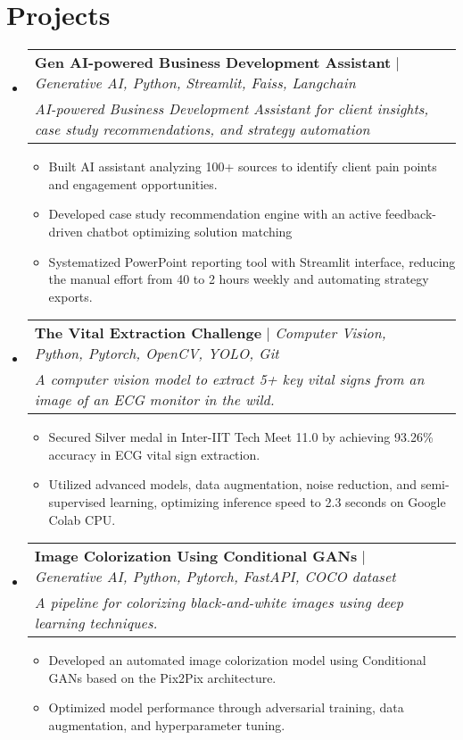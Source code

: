 \documentclass[letterpaper,11pt]{article}
\makeatletter
\newcommand{\resumeItem}[1]{
  \item\small{
    {#1 \vspace{-2pt}}
  }
}
\newcommand{\resumeProjectHeading}[3]{
    \item
    \begin{tabular*}{0.97\textwidth}{l@{\extracolsep{\fill}}r}
      \small#1 & #2 \\
    \textit{\footnotesize{#3}}
    \end{tabular*}\vspace{-7pt}
}
\newcommand{\resumeSubHeadingListStart}{\begin{itemize}[leftmargin=0.15in, label={}]}
\newcommand{\resumeSubHeadingListEnd}{\end{itemize}}
\newcommand{\resumeItemListStart}{\begin{itemize}}
\newcommand{\resumeItemListEnd}{\end{itemize}\vspace{-5pt}}
\makeatother
\begin{document}
\section{Projects}
    \resumeSubHeadingListStart
      \resumeProjectHeading
          {\textbf{Gen AI-powered Business Development Assistant} $|$  \emph{Generative AI, Python, Streamlit, Faiss, Langchain}}{}
          {AI-powered Business Development Assistant for client insights, case study recommendations, and strategy automation}
          \resumeItemListStart
            \resumeItem{Built AI assistant analyzing 100+ sources to identify client pain points and engagement opportunities.}
            \resumeItem{Developed case study recommendation engine with an active feedback-driven chatbot optimizing solution matching}
            \resumeItem{Systematized PowerPoint reporting tool with Streamlit interface, reducing the manual effort from 40 to 2 hours weekly and automating strategy exports.}
          \resumeItemListEnd
      \resumeProjectHeading
          {\textbf{The Vital Extraction Challenge} $|$ \emph{Computer Vision, Python, Pytorch, OpenCV, YOLO, Git}}{}
          {A computer vision model to extract 5+ key vital signs from an image of an ECG monitor in the wild.}
          \resumeItemListStart
            \resumeItem{Secured Silver medal in Inter-IIT Tech Meet 11.0 by achieving 93.26\% accuracy in ECG vital sign extraction.}
            \resumeItem{Utilized advanced models, data augmentation, noise reduction, and semi-supervised learning, optimizing inference speed to 2.3 seconds on Google Colab CPU.}
          \resumeItemListEnd

        \resumeProjectHeading
          {\textbf{Image Colorization Using Conditional GANs} $|$ \emph{Generative AI, Python, Pytorch, FastAPI, COCO dataset}}{}
          {A pipeline for colorizing black-and-white images using deep learning techniques.}
          \resumeItemListStart
            \resumeItem{Developed an automated image colorization model using Conditional GANs based on the Pix2Pix architecture.}
            \resumeItem{Optimized model performance through adversarial training, data augmentation, and hyperparameter tuning.}
          \resumeItemListEnd
    \resumeSubHeadingListEnd



%
\end{document}
